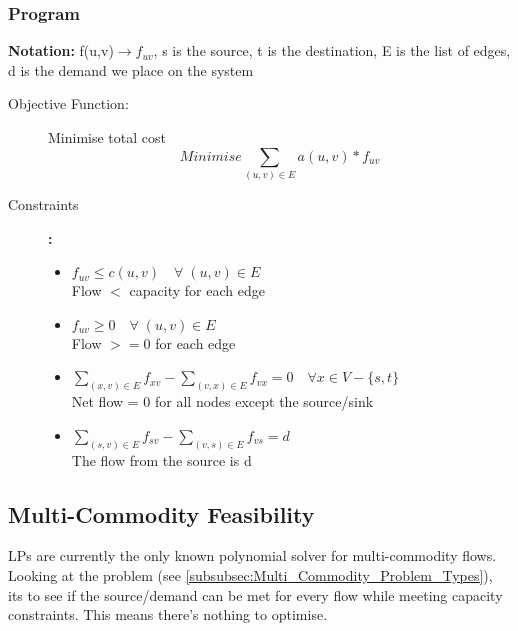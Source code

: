\subsubsection{Program}
\textbf{Notation:} f(u,v)$\rightarrow f_{uv}$, s is the source, t is the destination, E is the list of edges, d is the demand we place on the system
\begin{description}
\item [Objective Function:] Minimise total cost
\begin{equation}
    Minimise \sum_{(u,v)\in E} a(u,v) * f_{uv}  \nonumber
\end{equation} 
\item [Constraints]\textbf{:}  
\begin{itemize}
    \item \(f_{uv} \leq c(u,v) \quad \forall \;(u,v) \in E\) \\ Flow $<$ capacity for each edge
    \item \(f_{uv} \geq 0 \quad \forall \;(u,v) \in E\) \\ Flow $>=0$ for each edge
    \item \(\sum_{(x,v)\in E} f_{xv} - \sum_{(v,x)\in E} f_{vx} = 0 \quad \forall x \in V-\{s,t\}\) \\ Net flow = 0 for all nodes except the source/sink
    \item \(\sum_{(s,v)\in E} f_{sv} - \sum_{(v,s)\in E} f_{vs} = d\) \\ The flow from the source is d 
    \end{itemize}
\end{description}

\subsection{Multi-Commodity Feasibility}
LPs are currently the only known polynomial solver for multi-commodity flows. Looking at the problem (see \ref{subsubsec:Multi_Commodity_Problem_Types}), its to see if the source/demand can be met for every flow while meeting capacity constraints. This means there's nothing to optimise.

